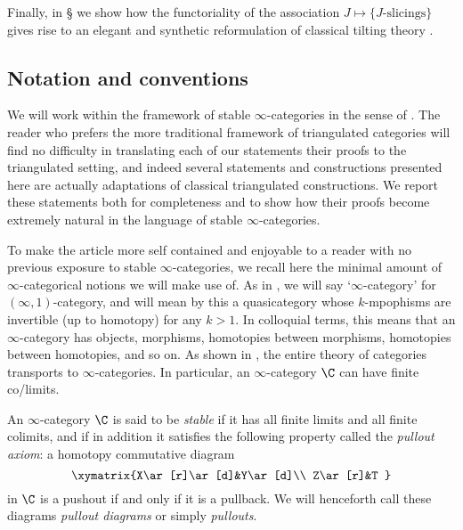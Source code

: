Finally, in § we show how the functoriality of the association $J\mapsto \{\text{$J$-slicings}\}$ gives rise to an elegant and synthetic reformulation of classical tilting theory \cite{happel}.
{\color{green!40!black}
\subsection{Notation and conventions}
We will work within the framework of stable $\infty$-categories in the sense of \cite{LurieHA}. The reader who prefers the more traditional framework of triangulated categories will find no difficulty in translating  each of our statements their proofs to the triangulated setting, and indeed several statements and constructions presented here are actually adaptations of classical triangulated constructions. We report these statements both for completeness and to show how their proofs become extremely natural in the language of stable $\infty$-categories.
\par
To make the article more self contained and enjoyable to a reader with no previous exposure to stable $\infty$-categories, we recall here the minimal amount of $\infty$-categorical notions we will make use of. As in \cite{HTT}, we will say `$\infty$-category' for $(\infty,1)$-category, and will mean by this a quasicategory whose $k$-mpophisms are invertible (up to homotopy) for any $k>1$. In colloquial terms, this means that an $\infty$-category has objects, morphisms, homotopies between morphisms, homotopies between homotopies, and so on. As shown in \cite{HTT, Joyal2008}, the entire theory of categories transports to $\infty$-categories. In particular, an $\infty$-category $\C$ can have finite co/limits.
\par
An $\infty$-category $\C$ is said to be \emph{stable}  if it has all finite limits and all finite colimits, and if in addition it satisfies the following property called the \emph{pullout axiom}:
a homotopy commutative diagram
\[
\xymatrix{X\ar[r]\ar[d]&Y\ar[d]\\
Z\ar[r]&T
}
\]
in $\C$ is a pushout if and only if it is a pullback. We will henceforth call these diagrams \emph{pullout diagrams} or simply \emph{pullouts}.
\par
}
